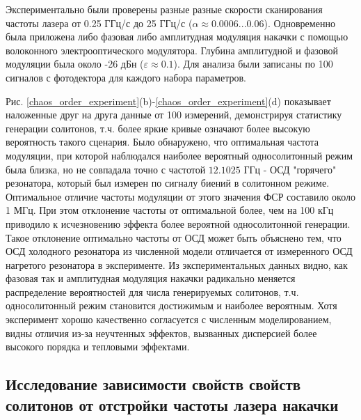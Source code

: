Экспериментально были проверены разные разные скорости сканирования частоты лазера от 0.25 ГГц/с до 25 ГГц/с ($\alpha \approx 0.0006...0.06$). Одновременно была приложена либо фазовая либо амплитудная модуляция накачки с помощью волоконного электрооптического модулятора. Глубина амплитудной и фазовой модуляции была около -26 дБн ($\varepsilon \approx 0.1$). Для анализа были записаны по 100 сигналов с фотодектора для каждого набора параметров.

Рис. \ref{chaos_order_experiment}(b)-\ref{chaos_order_experiment}(d) показывает наложенные друг на друга данные от 100 измерений, демонстрируя статистику генерации солитонов, т.ч. более яркие кривые означают более высокую вероятность такого сценария. Было обнаружено, что оптимальная частота модуляции, при которой наблюдался наиболее вероятный односолитонный режим была близка, но не совпадала точно с частотой $12.1025$ ГГц - ОСД "горячего" резонатора, который был измерен по сигналу биений в солитонном режиме. Оптимальное отличие частоты модуляции от этого значения ФСР составило около 1 МГц. При этом отклонение частоты от оптимальной более, чем на 100 кГц приводило к исчезновению эффекта более вероятной односолитонной генерации. Такое отклонение оптимально частоты от ОСД может быть объяснено тем, что ОСД холодного резонатора из численной модели отличается от измеренного ОСД нагретого резонатора в эксперименте. Из экспериментальных данных видно, как фазовая так и амплитудная модуляция накачки радикально меняется распределение вероятностей для числа генерируемых солитонов, т.ч. односолитонный режим становится достижимым и наиболее вероятным. Хотя эксперимент хорошо качественно согласуется с численным моделированием, видны отличия из-за неучтенных эффектов, вызванных дисперсией более высокого порядка и тепловыми эффектами.

\subsection{Исследование зависимости свойств свойств солитонов от отстройки частоты лазера накачки}

